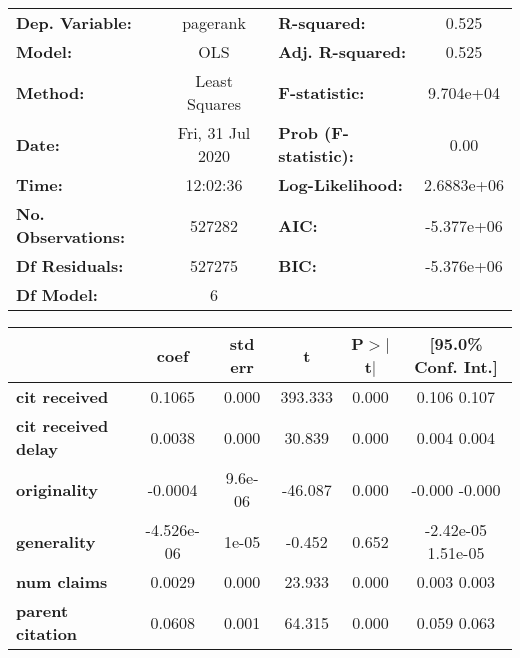 \begin{center}
\begin{tabular}{lclc}
\toprule
\textbf{Dep. Variable:}     &     pagerank     & \textbf{  R-squared:         } &       0.525    \\
\textbf{Model:}             &       OLS        & \textbf{  Adj. R-squared:    } &       0.525    \\
\textbf{Method:}            &  Least Squares   & \textbf{  F-statistic:       } &   9.704e+04    \\
\textbf{Date:}              & Fri, 31 Jul 2020 & \textbf{  Prob (F-statistic):} &       0.00     \\
\textbf{Time:}              &     12:02:36     & \textbf{  Log-Likelihood:    } &   2.6883e+06   \\
\textbf{No. Observations:}  &      527282      & \textbf{  AIC:               } &   -5.377e+06   \\
\textbf{Df Residuals:}      &      527275      & \textbf{  BIC:               } &   -5.376e+06   \\
\textbf{Df Model:}          &           6      & \textbf{                     } &                \\
\bottomrule
\end{tabular}
\begin{tabular}{lccccc}
                            & \textbf{coef} & \textbf{std err} & \textbf{t} & \textbf{P$>$$|$t$|$} & \textbf{[95.0\% Conf. Int.]}  \\
\midrule
\textbf{cit received}       &       0.1065  &        0.000     &   393.333  &         0.000        &         0.106     0.107       \\
\textbf{cit received delay} &       0.0038  &        0.000     &    30.839  &         0.000        &         0.004     0.004       \\
\textbf{originality}        &      -0.0004  &      9.6e-06     &   -46.087  &         0.000        &        -0.000    -0.000       \\
\textbf{generality}         &   -4.526e-06  &        1e-05     &    -0.452  &         0.652        &     -2.42e-05  1.51e-05       \\
\textbf{num claims}         &       0.0029  &        0.000     &    23.933  &         0.000        &         0.003     0.003       \\
\textbf{parent citation}    &       0.0608  &        0.001     &    64.315  &         0.000        &         0.059     0.063       \\

\end{tabular}
\end{center}
